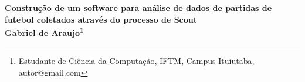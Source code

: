 \begin{center}
\textbf{Construção de um software para análise de dados de partidas de futebol coletados através do processo de Scout\\
Gabriel de Araujo\footnote[1]{Estudante de Ciência da Computação, IFTM, Campus Ituiutaba, autor@gmail.com}}
\end{center}
